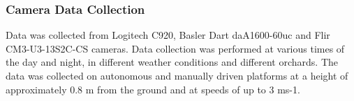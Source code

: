 \documentclass[preprint,authoryear,12pt]{elsarticle}
\begin{document}





    \subsubsection{Camera Data Collection}
        Data was collected from Logitech C920, Basler Dart daA1600-60uc and Flir CM3-U3-13S2C-CS cameras.
    	Data collection was performed at various times of the day and night, in different weather conditions and different orchards.
    	The data was collected on autonomous and manually driven platforms at a height of approximately 0.8 m from the ground and at speeds of up to 3 ms-1.
    	
\end{document}
